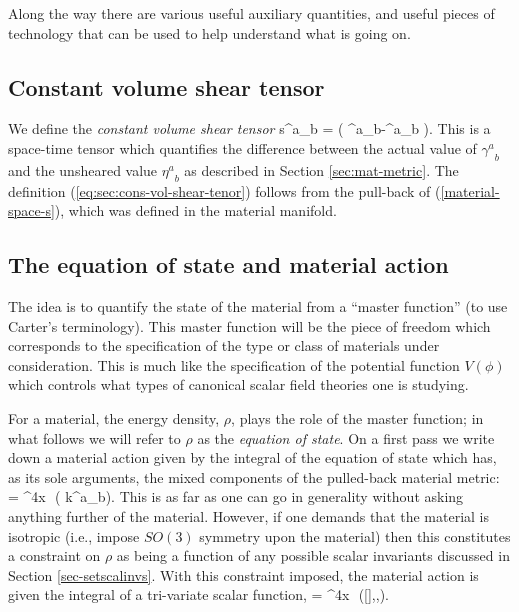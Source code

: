 Along the way there are various useful auxiliary quantities, and useful pieces of technology that can be used to help understand what is going on.

\subsection{Constant volume shear tensor}
We define the \textit{constant  volume shear tensor}
\bea
\label{eq:sec:cons-vol-shear-tenor}
{s^a}_b = \left( {\gamma^a}_b-{\eta^a}_b \right).
\eea
This is a space-time tensor which quantifies the difference between the actual value of ${\gamma^a}_b$ and the unsheared value ${\eta^a}_b$ as described in Section \ref{sec:mat-metric}. The definition (\ref{eq:sec:cons-vol-shear-tenor}) follows from the pull-back of (\ref{material-space-s}), which was defined in the material manifold.

\subsection{The equation of state and material action}
\label{sec:eos-introd}
The idea is to quantify the state of the material  from a ``master function'' (to use Carter's terminology). This master function will be the piece of freedom which corresponds to the specification of the type or class of materials under consideration. This is much like the specification of the potential function $V(\phi)$ which controls what types of canonical scalar field theories one is studying. 

For a material, the energy density, $\rho$,    plays the role of the master function; in what follows we will refer to $\rho$ as the \textit{equation of state}. On a first pass  we write down a material action given by the integral of the equation of state which has, as its sole arguments, the mixed components of the pulled-back material metric:
\bea
\label{material-action-k-no-invaraints-1}
 =  \int \dd^4x\,\, \rho\left( {k^a}_b\right).
\eea 
This is as far as one can go in generality without asking anything further of the material. However, if one demands that the material is isotropic (i.e., impose $SO(3)$ symmetry upon the material) then this constitutes a constraint on  $\rho$ as being a  function of any possible scalar invariants discussed in Section \ref{sec-setscalinvs}. With this constraint imposed, the material action is given the integral of a tri-variate scalar function,
\bea
\label{eq:matter-action-material}
 = \int \dd^4x\,\, \rho\left([],,\right).
\eea


